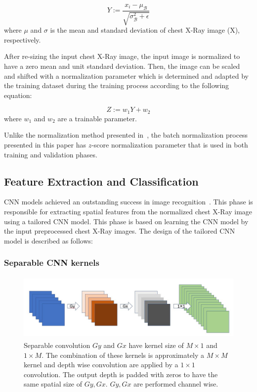 \begin{equation}
Y := \frac{x_i - \mu_{\mathcal B}}{\sqrt{\sigma_{\mathcal B}^2 + \epsilon}}
\label{eq1}
\end{equation}
where $\mu$ and $\sigma$ is the mean and standard deviation of chest X-Ray image (X), respectively.

After re-sizing the input chest X-Ray image, the input image is normalized to have a zero mean and unit standard deviation. Then,  the image can be scaled and shifted with a normalization parameter which is determined and adapted by the training dataset during the training process according to the following equation: 

\begin{equation}
Z := w_1 Y + w_2
\label{eq2}
\end{equation}
where $w_1$ and $w_2$ are a trainable parameter.

Unlike the  normalization method presented in~\cite{ioffe2015batch}, the batch normalization process presented in this paper has $z$-score normalization parameter that is used in both training and validation phases.


\subsection{Feature Extraction and Classification}

CNN models achieved an outstanding success in image recognition~\cite{lecun2015deep}. This phase  is responsible for extracting spatial features from the normalized chest X-Ray image using a tailored CNN model.  This phase is based on learning the CNN model by the input preprocessed chest X-Ray images. The design of the tailored CNN model is described as follows: 

\subsubsection{Separable CNN kernels}
\begin{figure}
\begin{center}
\includegraphics[height=33mm,width=14.0cm]{Figures/fig2.jpg}
\caption{Separable convolution  $Gy$ and $Gx$ have kernel size of $M\times1$ and $1 \times M$. The combination of these kernels is approximately a $M\times M$ kernel  and depth wise convolution are applied by a $1\times1$ convolution. The output depth  is padded with zeros to have the same spatial size of  $Gy, Gx$. $Gy, Gx$ are performed channel wise. }
\label{fig2}\end{center}\end{figure}


